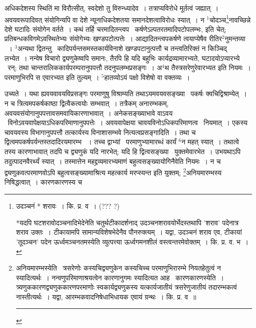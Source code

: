 \documentclass[11pt, openany]{book}
\begin{document}
\newpage
\noindent
अधिकदेशस्य स्थितिं मा विरौत्सीत्, स्वदेशो तु विरुन्ध्यादेव~। तत्राप्यविरोधे मूर्तत्वं जह्यात्~। अवयवरूपादिवत् संयोगिन्यपि वा देशे न्यूनाधिकदेशतया समानदेशत्वाविरोधः स्यात्~। न ${}^1$चोदञ्च\renewcommand{\thefootnote}{१}\footnote{उदञ्चनं * शरावः~। कि. प्र. व~। (??? ?)

*यदपि घटशरावोदञ्चनादिभेदेनेति चतुर्थटीकादर्शनाद् उदञ्चनशरावयोर्भेदस्तथापि 'शराव' पदेनात्र शराव उक्तः~। टीकायामपि सामान्यविशेषभेदेनैव पौनरुक्त्यम्~। यद्वा, उदञ्चनं शराव एव, टीकायां 'तूदञ्चन' पदेन ऊर्ध्वमञ्चनतमस्येति व्युत्पत्त्या ऊर्ध्वगमनशीलं वस्त्वन्तरमेवोक्तम्~। कि. प्र. व. भ~।}नावच्छिन्ने देशे घटादिः संयोगेन वर्तते~। कथं तर्हि चरमादितन्त्वप \textendash\ कर्षणेऽल्पतरतमादिपटोपलम्भः, इति चेत्; प्रतिबन्धकविगमेऽवस्थितेभ्यः संयोगेभ्यः खण्डपटोत्पत्तेः~। आद्यादितन्त्वपकर्षणे त्वयाप्येषैव रीतिर$^2$नुमन्तव्या ~। ${}^3$अन्यथा द्वितन्तु \textendash\ कादिपर्यन्तसमस्तकार्यविनाशे खण्डपटानुत्पत्तौ च तन्त्वतिरिक्तं न किञ्चिद् लभ्येत~। नन्वेष विचारो द्व्यणुकेष्वपि समानः, तैरपि हि यदि बहुभिः कार्यद्रव्यामारभ्यते, घटादयोऽप्यारभ्ये \textendash\ रन्; तथा चान्तरालिककार्यपरम्परानुपपत्तौ तदनुपलम्भप्रसङ्गः~। अ$^4$थ तैस्त्रसरेणुरेवारभ्यत इति नियमः~। परमाणुभिरपि स एवारभ्यत इति तुल्यम्~। ${}^5$हातव्योऽयं पक्षो विशेषो वा वक्तव्यः~।

\begin{sloppypar}
उच्यते~। यथा ह्यवयवावयविप्रसङ्गः परमाणुषु विश्राम्यति तथाऽयमवयवसङ्ख्या \textendash\ पकर्षः क्वचिद्विश्राम्येत्~। न च त्रित्वमपकर्षकाष्ठा द्वित्वैकत्वयोः सम्भवात्~। तत्रैकम् अनारम्भकम्, अवयवसंयोगानुपपत्तावसमवायिकारणाभावात्~। अनेकसङ्ख्याभावे वाऽवय \textendash\ विनोऽवयवापेक्षयाऽधिकपरिमाणानुपपत्तेः~। अवयवापेक्षया चावयविनोऽधिकपरिमाणत्व \textendash\ नियमात्~। एकस्य चावयवस्य विभागानुपपत्तौ तत्कार्यस्य विनाशासम्भवे नित्यत्वप्रसङ्गादिति~। तथा च द्वित्वमपकर्षपर्यन्तस्तदादिरयमारम्भ ~। तच्च द्वाभ्यां \textendash\ परमाणुभ्यामारब्धं कार्यं ${}^6$न महत् स्यात्~। तथात्वे तस्य कारणाभावात् तदपि च द्व्यणुकं यदि नारभेत्; यदि हि द्वित्वसङ्ख्या \textendash\ युक्तमेवारभेत~। उभयथाऽपि तदुत्पादनवैरर्थ्यं स्यात्~। तस्मात्तेन महद्द्रव्यमारभ्यमाणं बहुत्वसङ्ख्यायोगिनैवेति नियमः~। न च द्व्यणुकवत्परमाणवोऽपि बहुत्वसङ्ख्यामाश्रित्य महत्कार्य मरप्स्यन्त इति युक्तम्; \renewcommand{\thefootnote}{२}\footnote{अनियमारम्भस्येति \textendash\ त्रसरेणोः कस्यचिद्व्यणुकेन कस्यचिच्च परमाणुभिरारम्भे नियतहेतुत्वं न स्यादित्यर्थः~। नन्वणुपरिमाणाश्रयत्वेन कारणानुगमः स्यादित्यत आह \textendash\ कारणकारणस्येति~। त्र्यणुककारणद्व्यणुककारणपरमाणोः स्वकार्यद्व्यणुकस्य यत्कार्यजातीयं त्रसरेणुजातीयं तदारम्भकत्वं नास्तीत्यर्थः~। यद्वा, आरम्भकवादनिषेधाभिधायक एवायं ग्रन्थः~। कि. प्र. व~॥\\ \rule{0.4\linewidth}{0.5pt}}अनियमारम्भस्य निषिद्धत्वात्~। कारणकारणस्य च 
\end{sloppypar}
\end{document}
